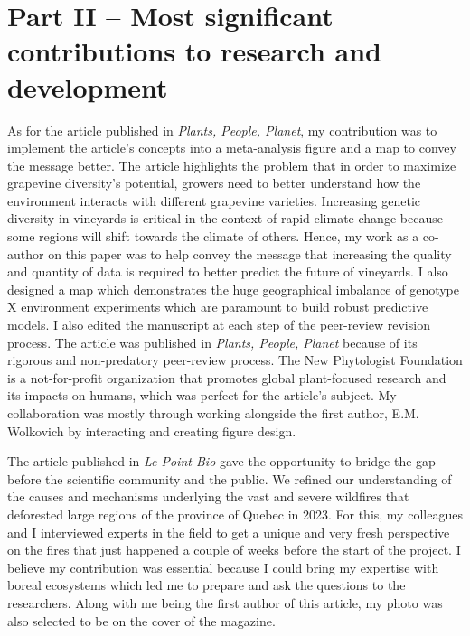\documentclass{article}
\begin{document}
\section*{Part II – Most significant contributions to research and development}
As for the article published in \textit{Plants, People, Planet}, my contribution was to implement the article's concepts into a meta-analysis figure and a map to convey the message better. The article highlights the problem that in order to maximize grapevine diversity's potential, growers need to better understand how the environment interacts with different grapevine varieties. Increasing genetic diversity in vineyards is critical in the context of rapid climate change because some regions will shift towards the climate of others. Hence, my work as a co-author on this paper was to help convey the message that increasing the quality and quantity of data is required to better predict the future of vineyards. I also designed a map which demonstrates the huge geographical imbalance of genotype X environment experiments which are paramount to build robust predictive models. I also edited the manuscript at each step of the peer-review revision process. The article was published in \textit{Plants, People, Planet} because of its rigorous and non-predatory peer-review process. The New Phytologist Foundation is a not-for-profit organization that promotes global plant-focused research and its impacts on humans, which was perfect for the article's subject. My collaboration was mostly through working alongside the first author, E.M. Wolkovich by interacting and creating figure design. 

The article published in \textit{Le Point Bio} gave the opportunity to bridge the gap before the scientific community and the public. We refined our understanding of the causes and mechanisms underlying the vast and severe wildfires that deforested large regions of the province of Quebec in 2023. For this, my colleagues and I interviewed experts in the field to get a unique and very fresh perspective on the fires that just happened a couple of weeks before the start of the project. I believe my contribution was essential because I could bring my expertise with boreal ecosystems which led me to prepare and ask the questions to the researchers. Along with me being the first author of this article, my photo was also selected to be on the cover of the magazine. \\
\end{document}
